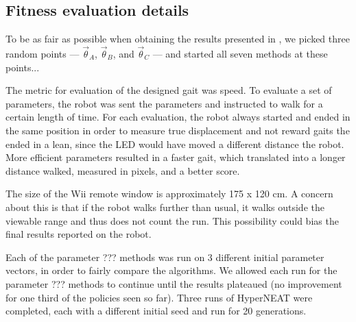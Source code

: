 \subsection{Fitness evaluation details}


To be as fair as possible when obtaining the results presented in
, we picked three random points --- $\vec{\theta}_A$,
$\vec{\theta}_B$, and $\vec{\theta}_C$ --- and started all seven
methods at these points...



The metric for evaluation of the designed gait was speed. To evaluate
a set of parameters, the robot was sent the parameters and instructed
to walk for a certain length of time. For each evaluation, the robot
always started and ended in the same position in order to measure true
displacement and not reward gaits the ended in a lean, since the LED
would have moved a different distance the robot. More efficient
parameters resulted in a faster gait, which translated into a longer
distance walked, measured in pixels, and a better score.

The size of the Wii remote window is approximately 175 x 120 cm. A
concern about this is that if the robot walks further than usual,
it walks outside the viewable range and thus does not count the run.
This possibility could bias the final results reported on the robot.

Each of the parameter ??? methods was run on 3 different initial
parameter vectors, in order to fairly compare the algorithms. We allowed 
each run for the parameter ??? methods to
continue until the results plateaued (no improvement for one third of
the policies seen so far). Three runs of HyperNEAT were completed,
each with a different initial seed and run for 20 generations.
